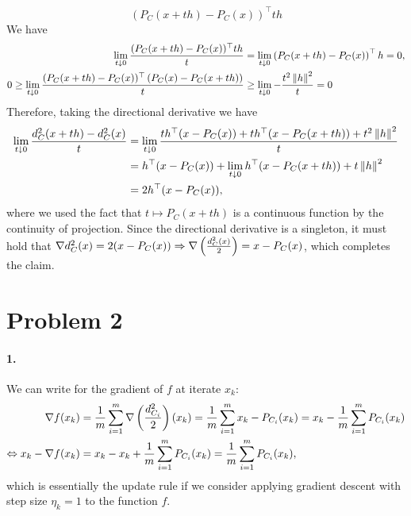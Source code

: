 \documentclass[10pt]{article}
\begin{document}
\begin{itemize}
\[    (P_C(x + th) - P_C(x))^\top th
\]
We have
\begin{align*}
    \lim_{t \downarrow 0} \frac{(P_C(x + th) - P_C(x))^\top th}{t} &=
        \lim_{t \downarrow 0} \left( P_C(x + th) - P_C(x) \right)^\top h = 0, \\
    0 \geq \lim_{t \downarrow 0} \frac{(P_C(x + th) - P_C(x))^\top \left(P_C(x) -
    P_C(x +
    th)\right)}{t} &\geq \lim_{t \downarrow 0} -\frac{t^2 \left \| h \right \|^2}{t} = 0
\end{align*}
Therefore, taking the directional derivative we have
\begin{align*}
    \lim_{t \downarrow 0} \frac{d_C^2(x + th) - d_C^2(x)}{t} &=
    \lim_{t \downarrow 0} \frac{t h^\top(x - P_C(x)) + t h^\top (x - P_C(x + th))
        + t^2 \left \| h \right \|^2}{t} \\ &=
    h^\top (x - P_C(x)) + \lim_{t \downarrow 0}  h^\top (x - P_C(x + th)) +
        t \left \| h \right \|^2 \\
    &= 2 h^\top (x - P_C(x)),
\end{align*}
where we used the fact that $t \mapsto P_C(x + th)$ is a continuous function
by the continuity of projection. Since the directional derivative is a
singleton, it must hold that $\nabla d_C^2(x) = 2(x - P_C(x)) \Rightarrow
\nabla \left( \frac{d_C^2(x)}{2}\right) = x - P_C(x)$, which completes the claim.
\end{itemize}
\section*{Problem 2}
\paragraph{1.}
We can write for the gradient of $f$ at iterate $x_k$:
\begin{align*}
    \nabla f(x_k) &= \frac{1}{m} \sum_{i=1}^{m} \nabla \left(
    \frac{d^2_{C_i}}{2} \right)(x_k) = \frac{1}{m} \sum_{i=1}^m x_k -
    P_{C_i}(x_k) = x_k - \frac{1}{m} \sum_{i=1}^m P_{C_i}(x_k) \\
    \Leftrightarrow
    x_k - \nabla f(x_k) &= x_k - x_k + \frac{1}{m} \sum_{i=1}^m P_{C_i}(x_k)
        = \frac{1}{m} \sum_{i=1}^m P_{C_i}(x_k),
\end{align*}
which is essentially the update rule if we consider applying gradient descent
with step size $\eta_k = 1$ to the function $f$.
\end{document}
